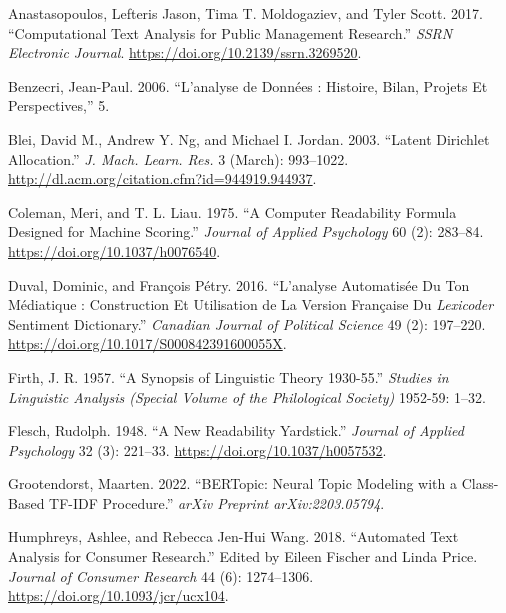 \documentclass[
  letterpaper,
  DIV=11,
  numbers=noendperiod]{scrreprt}
\newlength{\cslhangindent}
\newenvironment{CSLReferences}[2] %
 {\begin{list}{}{%
  \setlength{\itemindent}{0pt}
  \setlength{\leftmargin}{0pt}
  \setlength{\parsep}{0pt}
  \ifodd #1
   \setlength{\leftmargin}{\cslhangindent}
   \setlength{\itemindent}{-1\cslhangindent}
  \fi
  \setlength{\itemsep}{#2\baselineskip}}}
 {\end{list}}
\begin{document}
\label{refs}
\begin{CSLReferences}{1}{0}
Anastasopoulos, Lefteris Jason, Tima T. Moldogaziev, and Tyler Scott.
2017. {``Computational Text Analysis for Public Management Research.''}
\emph{{SSRN} Electronic Journal}.
\url{https://doi.org/10.2139/ssrn.3269520}.

Benzecri, Jean-Paul. 2006. {``L'analyse de Données : Histoire, Bilan,
Projets Et Perspectives,''} 5.

Blei, David M., Andrew Y. Ng, and Michael I. Jordan. 2003. {``Latent
Dirichlet Allocation.''} \emph{J. Mach. Learn. Res.} 3 (March):
993--1022. \url{http://dl.acm.org/citation.cfm?id=944919.944937}.

Coleman, Meri, and T. L. Liau. 1975. {``A Computer Readability Formula
Designed for Machine Scoring.''} \emph{Journal of Applied Psychology} 60
(2): 283--84. \url{https://doi.org/10.1037/h0076540}.

Duval, Dominic, and François Pétry. 2016. {``L'analyse Automatisée Du
Ton Médiatique : Construction Et Utilisation de La Version Française Du
\emph{Lexicoder} Sentiment Dictionary.''} \emph{Canadian Journal of
Political Science} 49 (2): 197--220.
\url{https://doi.org/10.1017/S000842391600055X}.

Firth, J. R. 1957. {``A Synopsis of Linguistic Theory 1930-55.''}
\emph{Studies in Linguistic Analysis (Special Volume of the Philological
Society)} 1952-59: 1--32.

Flesch, Rudolph. 1948. {``A New Readability Yardstick.''} \emph{Journal
of Applied Psychology} 32 (3): 221--33.
\url{https://doi.org/10.1037/h0057532}.

Grootendorst, Maarten. 2022. {``{BERTopic}: Neural Topic Modeling with a
Class-Based {TF}-{IDF} Procedure.''} \emph{{arXiv} Preprint
{arXiv}:2203.05794}.

Humphreys, Ashlee, and Rebecca Jen-Hui Wang. 2018. {``Automated Text
Analysis for Consumer Research.''} Edited by Eileen Fischer and Linda
Price. \emph{Journal of Consumer Research} 44 (6): 1274--1306.
\url{https://doi.org/10.1093/jcr/ucx104}.


\end{CSLReferences}
\end{document}
